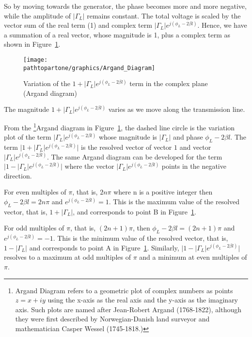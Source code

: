 So by moving towards the generator, the phase becomes more and more negative, while the amplitude of $|\Gamma_L|$ remains constant. The total voltage is scaled by the vector sum of the real term (1) and complex term $|\Gamma_L| e^{j(\phi_L -2 \beta l)}$. Hence, we have a summation of a real vector, whose magnitude is 1, plus a complex term as shown in Figure~\ref{fig:kjhgfdwert}. 
\begin{figure}[h]
\centering
\texttt{[image: \\pathtopartone/graphics/Argand\_Diagram]}
\caption{Variation of the $1 + |\Gamma_L| e^{j(\phi_L -2 \beta l)}$ term in the complex plane (Argand diagram)}
\label{fig:kjhgfdwert}
\end{figure}

The magnitude $1+|\Gamma_L| e^{j(\phi_L -2 \beta l)}$ varies as we move along the transmission line.

From the \footnote{
Argand Diagram refers to a geometric plot of complex numbers as points $z = x + iy$ using the x-axis as the real axis and the y-axis as the imaginary axis. Such plots are named after Jean-Robert Argand (1768-1822), although they were first described by Norwegian-Danish land surveyor and mathematician Casper Wessel (1745-1818.)
}Argand diagram in Figure~\ref{fig:kjhgfdwert}, the dashed line circle is the variation plot of the term $\lvert\Gamma_L\rvert e^{j (\phi_L - 2\beta l)}$ whose magnitude is $\lvert \Gamma_L\rvert$ and phase $\phi_L - 2 \beta l$. The term $\lvert 1 + \lvert\Gamma_L\rvert e^{j (\phi_L - 2\beta l)}\rvert$ is the resolved vector of vector $1$ and vector $\lvert\Gamma_L\rvert e^{j (\phi_L - 2\beta l)}$. The same Argand diagram can be developed for the term $\lvert1 - \lvert\Gamma_L\rvert e^{j (\phi_L - 2\beta l)}\rvert$ where the vector $\lvert\Gamma_L\rvert e^{j (\phi_L - 2\beta l)}$ points in the negative direction. 

For even multiples of $\pi$, that is, $2n\pi$ where n is a positive integer then $\phi_L - 2\beta l = 2n\pi$ and $ e^{j(\phi_L - 2 \beta l)} = 1$. This is the maximum value of the resolved vector, that is, $1 + \lvert\Gamma_L\rvert$, and corresponds to point B in Figure~\ref{fig:kjhgfdwert}.

For odd multiples of $\pi$, that is, $(2n + 1)\pi$, then $\phi_L - 2 \beta l=(2 n + 1)\pi$ and $e^{j (\phi_L - 2 \beta l)} = -1$. This is the minimum value of the resolved vector, that is, $1 - \lvert\Gamma_L\rvert$ and corresponds to point A in Figure~\ref{fig:kjhgfdwert}. Similarly, $\lvert 1 - \lvert\Gamma_L\rvert e^{j (\phi_L - 2\beta l)}\rvert$ resolves to a maximum at odd multiples of $\pi$ and a minimum at even multiples of $\pi$.

